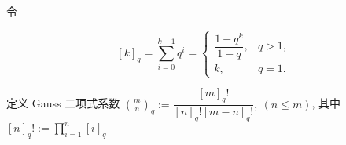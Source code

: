 令

\[
    [k]_q=\sum_{i=0}^{k-1}q^i=\begin{cases}
        \dfrac{1-q^k}{1-q},&q>1,\\
        k,&q=1.
    \end{cases}
\]

定义 Gauss 二项式系数 \(\binom{m}{n}_q:=\dfrac{[m]_q!}{[n]_q![m-n]_q!},~(n\leq m)\), 其中 \([n]_q!:=\prod_{i=1}^n [i]_q\)
